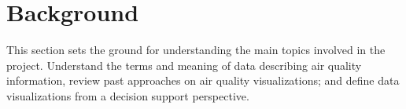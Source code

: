 \chapter{Background}
This section sets the ground for understanding the main topics involved in the project. Understand the terms and meaning of data describing air quality information, review past approaches on air quality visualizations; and define data visualizations from a decision support perspective.






